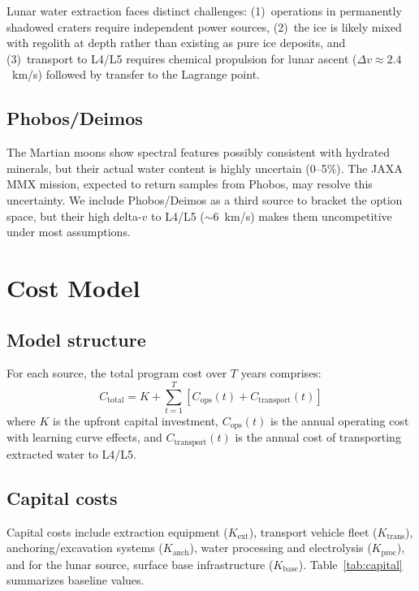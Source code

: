 \documentclass[preprint,12pt]{elsarticle}
\begin{document}
Lunar water extraction faces distinct challenges: (1)~operations in permanently shadowed craters require independent power sources, (2)~the ice is likely mixed with regolith at depth rather than existing as pure ice deposits, and (3)~transport to L4/L5 requires chemical propulsion for lunar ascent ($\Delta v \approx 2.4$~km/s) followed by transfer to the Lagrange point.

\subsection{Phobos/Deimos}
\label{sec:phobos}

The Martian moons show spectral features possibly consistent with hydrated minerals, but their actual water content is highly uncertain (0--5\%). The JAXA MMX mission, expected to return samples from Phobos, may resolve this uncertainty. We include Phobos/Deimos as a third source to bracket the option space, but their high delta-$v$ to L4/L5 ($\sim$6~km/s) makes them uncompetitive under most assumptions.

\section{Cost Model}
\label{sec:model}

\subsection{Model structure}

For each source, the total program cost over $T$ years comprises:
\begin{equation}
    C_\text{total} = K + \sum_{t=1}^{T} \left[ C_\text{ops}(t) + C_\text{transport}(t) \right]
    \label{eq:total-cost}
\end{equation}
where $K$ is the upfront capital investment, $C_\text{ops}(t)$ is the annual operating cost with learning curve effects, and $C_\text{transport}(t)$ is the annual cost of transporting extracted water to L4/L5.

\subsection{Capital costs}

Capital costs include extraction equipment ($K_\text{ext}$), transport vehicle fleet ($K_\text{trans}$), anchoring/excavation systems ($K_\text{anch}$), water processing and electrolysis ($K_\text{proc}$), and for the lunar source, surface base infrastructure ($K_\text{base}$). Table~\ref{tab:capital} summarizes baseline values.
\end{document}
